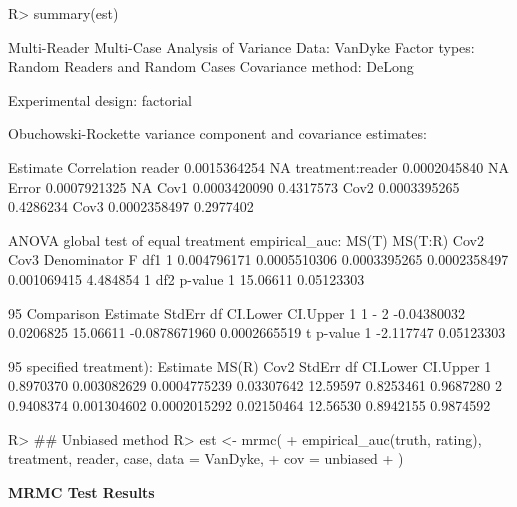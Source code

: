 \documentclass[
]{jss}
\begin{document}
\begin{CodeChunk}
\begin{CodeInput}
R> summary(est)
\end{CodeInput}
\begin{CodeOutput}
Multi-Reader Multi-Case Analysis of Variance
Data: VanDyke
Factor types: Random Readers and Random Cases
Covariance method: DeLong

Experimental design: factorial 

Obuchowski-Rockette variance component and covariance estimates:

                     Estimate Correlation
reader           0.0015364254          NA
treatment:reader 0.0002045840          NA
Error            0.0007921325          NA
Cov1             0.0003420090   0.4317573
Cov2             0.0003395265   0.4286234
Cov3             0.0002358497   0.2977402


ANOVA global test of equal treatment empirical_auc:
        MS(T)      MS(T:R)         Cov2         Cov3 Denominator        F df1
1 0.004796171 0.0005510306 0.0003395265 0.0002358497 0.001069415 4.484854   1
       df2    p-value
1 15.06611 0.05123303


95%
  Comparison    Estimate    StdErr       df      CI.Lower      CI.Upper
1      1 - 2 -0.04380032 0.0206825 15.06611 -0.0878671960  0.0002665519
          t    p-value
1 -2.117747 0.05123303


95%
specified treatment):
   Estimate       MS(R)         Cov2     StdErr       df  CI.Lower  CI.Upper
1 0.8970370 0.003082629 0.0004775239 0.03307642 12.59597 0.8253461 0.9687280
2 0.9408374 0.001304602 0.0002015292 0.02150464 12.56530 0.8942155 0.9874592
\end{CodeOutput}
\end{CodeChunk}

\begin{CodeChunk}
\begin{CodeInput}
R> ## Unbiased method
R> est <- mrmc(
+   empirical_auc(truth, rating), treatment, reader, case, data = VanDyke,
+   cov = unbiased
+ )
\end{CodeInput}
\end{CodeChunk}

\textbf{MRMC Test Results}
\end{document}
